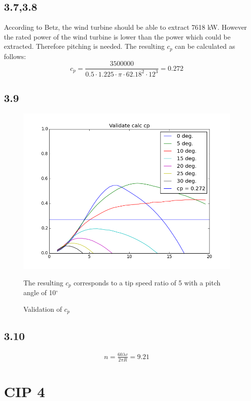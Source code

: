 \documentclass[10pt]{article}
\begin{document}
\subsection{3.7,3.8}
According to Betz, the wind turbine should be able to extract 7618 kW.
However the rated power of the wind turbine is lower than the power which could be extracted. Therefore pitching is needed. The resulting $c_p$ can be calculated as follows:
\begin{equation}
c_p = \frac{3500000}{0.5 \cdot 1.225 \cdot \pi\cdot  62.18^2 \cdot  12^3} = 0.272
\end{equation}
\subsection{3.9}
\begin{figure}[H]
\centering
\includegraphics[width=1\linewidth]{../CIP_3/WT_Perf/Output/validated_cp.png}
\caption{Validation of $c_p$}
\label{fig:validate}
The resulting $c_p$ corresponds to a tip speed ratio of 5 with a pitch angle of 10$^\circ$
\end{figure} 
\subsection{3.10}
\begin{align*}
n = \frac{60 \lambda v}{2 \pi R} = 9.21
\end{align*}
\newpage
\section{CIP 4}
\end{document}
